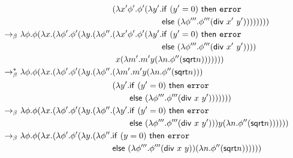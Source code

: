 \begin{example}
\begin{align}
& \phantom{\lambda \phi. \phi ( \lambda x. ( \lambda \phi'. \phi' ( \lambda y. ( \lambda \phi''. } 
( \lambda x' \phi'. \phi' ( \lambda y'.  \mathsf{if} \ (y' =0)  \ \mathsf{then} \ \mathtt{error}  \notag\\
& \phantom{\lambda \phi. \phi ( \lambda x. ( \lambda \phi'. \phi' ( \lambda y. ( \lambda \phi''.( \lambda x' \phi'. \phi' ( \lambda y'.   } 
 \mathsf{else}  \  (\lambda \phi'''. \phi''' (\mathsf{div} \ x' \ y') )) ) ) )))\notag \\
\bconv \ & \lambda \phi. \phi ( \lambda x. ( \lambda \phi'. \phi' ( \lambda y. ( \lambda \phi''. ( \lambda x' \phi'. \phi' ( \lambda y'.  \mathsf{if} \ (y' = 0)  \ \mathsf{then} \ \mathtt{error}  \notag \\
&  \phantom{\lambda \phi. \phi ( \lambda x. ( \lambda \phi'. \phi' ( \lambda y. ( \lambda \phi''. ( \lambda x' \phi'. \phi' ( \lambda y'. }
 \mathsf{else}  \  (\lambda \phi'''. \phi''' (\mathsf{div} \ x' \ y') )) ) \notag \\
& \phantom{\lambda \phi. \phi ( \lambda x. ( \lambda \phi'. \phi' ( \lambda y. ( \lambda \phi''. ( }
 x ( \lambda m'. m' y (\lambda n.  \phi''(  \mathsf{sqrt}  n))) ) )))\notag \\
 \bred \ & \lambda \phi. \phi ( \lambda x. ( \lambda \phi'. \phi' ( \lambda y. ( \lambda \phi''.   ( \lambda m'. m' y (\lambda n.  \phi''(  \mathsf{sqrt}  n))) \notag \\
 & \phantom{\lambda \phi. \phi ( \lambda x. ( \lambda \phi'. \phi' ( \lambda y. ( \lambda \phi''.  }
 ( \lambda y'.  \mathsf{if} \ (y' = 0)  \ \mathsf{then} \ \mathtt{error}  \notag \\
& \phantom{\lambda \phi. \phi ( \lambda x. ( \lambda \phi'. \phi' ( \lambda y. ( \lambda \phi''.   ( \lambda y'.  }  
  \mathsf{else}  \  (\lambda \phi'''. \phi''' (\mathsf{div} \ x \ y') )) ) )))\notag \\
 \bconv \ & \lambda \phi. \phi ( \lambda x. ( \lambda \phi'. \phi' ( \lambda y. ( \lambda \phi''.    ( \lambda y'.  \mathsf{if} \ (y' = 0)  \ \mathsf{then} \ \mathtt{error}  \notag \\
 & \phantom{\lambda \phi. \phi ( \lambda x. ( \lambda \phi'. \phi' ( \lambda y. ( \lambda \phi''.    ( \lambda y'. }
  \mathsf{else}  \  (\lambda \phi'''. \phi''' (\mathsf{div} \ x \ y') )) y (\lambda n.  \phi''(  \mathsf{sqrt}  n)) ) )))\notag \\
  \bconv \ & \lambda \phi. \phi ( \lambda x. ( \lambda \phi'. \phi' ( \lambda y. ( \lambda \phi''.    \mathsf{if} \ (y = 0)  \ \mathsf{then} \ \mathtt{error}  \notag \\
  & \phantom{\lambda \phi. \phi ( \lambda x. ( \lambda \phi'. \phi' ( \lambda y. ( \lambda \phi''.  }
   \mathsf{else}  \  (\lambda \phi'''. \phi''' (\mathsf{div} \ x \ y) )  (\lambda n.  \phi''(  \mathsf{sqrt}  n)) ) ))) \label{eq:exdivbyzeroCPScontrol} 
\end{align}
\end{example}

